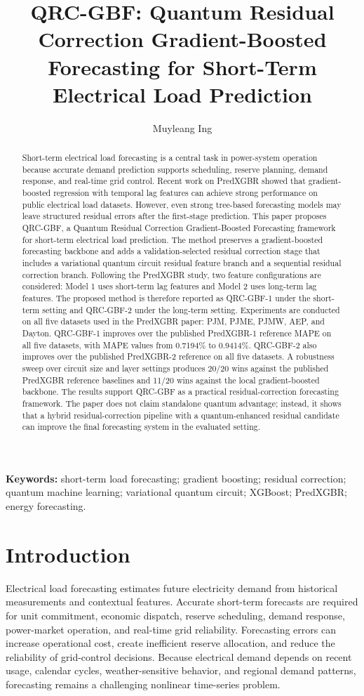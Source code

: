 \documentclass[11pt]{article}
\title{QRC-GBF: Quantum Residual Correction Gradient-Boosted Forecasting for Short-Term Electrical Load Prediction}
\author{Muyleang Ing}
\date{}
\begin{document}
\maketitle

\begin{abstract}
Short-term electrical load forecasting is a central task in power-system operation because accurate demand prediction supports scheduling, reserve planning, demand response, and real-time grid control. Recent work on PredXGBR showed that gradient-boosted regression with temporal lag features can achieve strong performance on public electrical load datasets. However, even strong tree-based forecasting models may leave structured residual errors after the first-stage prediction. This paper proposes QRC-GBF, a Quantum Residual Correction Gradient-Boosted Forecasting framework for short-term electrical load prediction. The method preserves a gradient-boosted forecasting backbone and adds a validation-selected residual correction stage that includes a variational quantum circuit residual feature branch and a sequential residual correction branch. Following the PredXGBR study, two feature configurations are considered: Model 1 uses short-term lag features and Model 2 uses long-term lag features. The proposed method is therefore reported as QRC-GBF-1 under the short-term setting and QRC-GBF-2 under the long-term setting. Experiments are conducted on all five datasets used in the PredXGBR paper: PJM, PJME, PJMW, AEP, and Dayton. QRC-GBF-1 improves over the published PredXGBR-1 reference MAPE on all five datasets, with MAPE values from 0.7194\% to 0.9414\%. QRC-GBF-2 also improves over the published PredXGBR-2 reference on all five datasets. A robustness sweep over circuit size and layer settings produces 20/20 wins against the published PredXGBR reference baselines and 11/20 wins against the local gradient-boosted backbone. The results support QRC-GBF as a practical residual-correction forecasting framework. The paper does not claim standalone quantum advantage; instead, it shows that a hybrid residual-correction pipeline with a quantum-enhanced residual candidate can improve the final forecasting system in the evaluated setting.
\end{abstract}

\textbf{Keywords:} short-term load forecasting; gradient boosting; residual correction; quantum machine learning; variational quantum circuit; XGBoost; PredXGBR; energy forecasting.

\section{Introduction}
Electrical load forecasting estimates future electricity demand from historical measurements and contextual features. Accurate short-term forecasts are required for unit commitment, economic dispatch, reserve scheduling, demand response, power-market operation, and real-time grid reliability. Forecasting errors can increase operational cost, create inefficient reserve allocation, and reduce the reliability of grid-control decisions. Because electrical demand depends on recent usage, calendar cycles, weather-sensitive behavior, and regional demand patterns, forecasting remains a challenging nonlinear time-series problem.
\end{document}
